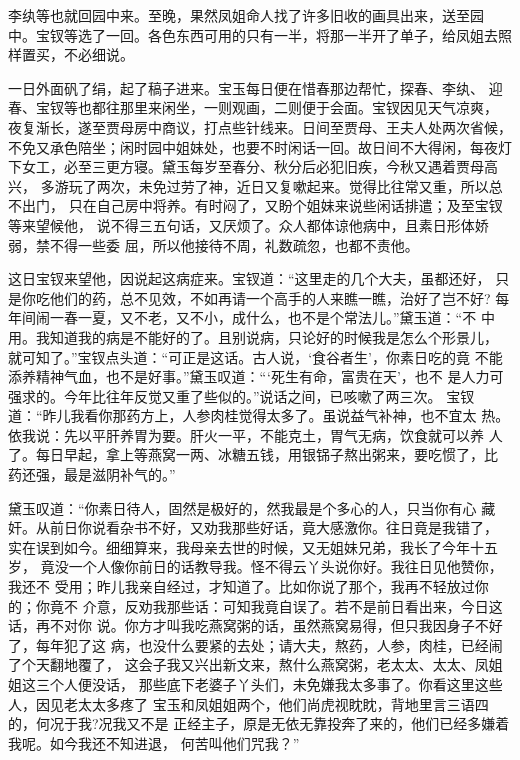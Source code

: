 李纨等也就回园中来。至晚，果然凤姐命人找了许多旧收的画具出来，送至园
中。宝钗等选了一回。各色东西可用的只有一半，将那一半开了单子，给凤姐去照
样置买，不必细说。

一日外面矾了绢，起了稿子进来。宝玉每日便在惜春那边帮忙，探春、李纨、
迎春、宝钗等也都往那里来闲坐，一则观画，二则便于会面。宝钗因见天气凉爽，
夜复渐长，遂至贾母房中商议，打点些针线来。日间至贾母、王夫人处两次省候，
不免又承色陪坐；闲时园中姐妹处，也要不时闲话一回。故日间不大得闲，每夜灯
下女工，必至三更方寝。黛玉每岁至春分、秋分后必犯旧疾，今秋又遇着贾母高兴，
多游玩了两次，未免过劳了神，近日又复嗽起来。觉得比往常又重，所以总不出门，
只在自己房中将养。有时闷了，又盼个姐妹来说些闲话排遣；及至宝钗等来望候他，
说不得三五句话，又厌烦了。众人都体谅他病中，且素日形体娇弱，禁不得一些委
屈，所以他接待不周，礼数疏忽，也都不责他。

这日宝钗来望他，因说起这病症来。宝钗道：“这里走的几个大夫，虽都还好，
只是你吃他们的药，总不见效，不如再请一个高手的人来瞧一瞧，治好了岂不好?
每年间闹一春一夏，又不老，又不小，成什么，也不是个常法儿。”黛玉道：“不
中用。我知道我的病是不能好的了。且别说病，只论好的时候我是怎么个形景儿，
就可知了。”宝钗点头道：“可正是这话。古人说，‘食谷者生’，你素日吃的竟
不能添养精神气血，也不是好事。”黛玉叹道：“‘死生有命，富贵在天’，也不
是人力可强求的。今年比往年反觉又重了些似的。”说话之间，已咳嗽了两三次。
宝钗道：“昨儿我看你那药方上，人参肉桂觉得太多了。虽说益气补神，也不宜太
热。依我说：先以平肝养胃为要。肝火一平，不能克土，胃气无病，饮食就可以养
人了。每日早起，拿上等燕窝一两、冰糖五钱，用银铞子熬出粥来，要吃惯了，比
药还强，最是滋阴补气的。”

黛玉叹道：“你素日待人，固然是极好的，然我最是个多心的人，只当你有心
藏奸。从前日你说看杂书不好，又劝我那些好话，竟大感激你。往日竟是我错了，
实在误到如今。细细算来，我母亲去世的时候，又无姐妹兄弟，我长了今年十五岁，
竟没一个人像你前日的话教导我。怪不得云丫头说你好。我往日见他赞你，我还不
受用；昨儿我亲自经过，才知道了。比如你说了那个，我再不轻放过你的；你竟不
介意，反劝我那些话：可知我竟自误了。若不是前日看出来，今日这话，再不对你
说。你方才叫我吃燕窝粥的话，虽然燕窝易得，但只我因身子不好了，每年犯了这
病，也没什么要紧的去处；请大夫，熬药，人参，肉桂，已经闹了个天翻地覆了，
这会子我又兴出新文来，熬什么燕窝粥，老太太、太太、凤姐姐这三个人便没话，
那些底下老婆子丫头们，未免嫌我太多事了。你看这里这些人，因见老太太多疼了
宝玉和凤姐姐两个，他们尚虎视眈眈，背地里言三语四的，何况于我?况我又不是
正经主子，原是无依无靠投奔了来的，他们已经多嫌着我呢。如今我还不知进退，
何苦叫他们咒我？”

